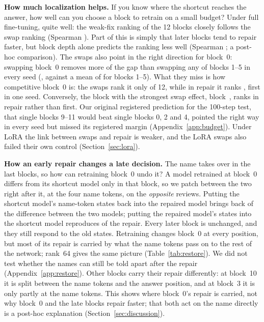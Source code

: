 \textbf{How much localization helps.} If you know where the shortcut reaches the answer, how well can you choose a
block to retrain on a small budget? Under full fine-tuning, quite well: the weak-fix ranking of the 12 blocks closely
follows the swap ranking (Spearman \lThreeSpearmanFullFTRange). Part of this is simply that later blocks tend to repair
faster, but block depth alone predicts the ranking less well (Spearman \lThreeSpearmanDepthFullFTRange; a post-hoc
comparison). The swaps also point in the right direction for block~0: swapping block~0 removes more of the gap than
swapping any of blocks 1--5 in every seed (\swapARemovedBZeroFullFTRange, against a mean of
\lThreeSwapMeanOneToFiveFullFTRange{} for blocks 1--5). What they miss is how competitive block~0 is: the swaps rank it
only \lThreeSwapRankBZeroFullFTRange{} of 12, while in repair it ranks \lThreeRankBZeroFullFTRange, first in one seed.
Conversely, the block with the strongest swap effect, block~\lThreeLocalizedBlockFullFT, ranks
\lThreeRankLocalizedFullFTRange{} in repair rather than first. Our original registered prediction for the 100-step
test, that single blocks 9--11 would beat single blocks 0, 2 and 4, pointed the right way in every seed but missed its
registered margin (Appendix~\ref{app:budget}). Under LoRA the link between swaps and repair is weaker, and the LoRA
swaps also failed their own control (Section~\ref{sec:lora}).

\textbf{How an early repair changes a late decision.} The name takes over in the last blocks, so how can retraining
block~0 undo it? A model retrained at block~0 differs from its shortcut model only in that block, so we patch between
the two right after it, at the four name tokens, on the \emph{opposite} reviews. Putting the shortcut model's
name-token states back into the repaired model brings back \fourBRestoreNameBZeroFullFTRange{} of the difference
between the two models; putting the repaired model's states into the shortcut model reproduces
\fourBReverseNameBZeroFullFTRange{} of the repair. Every later block is unchanged, and they still respond to the old
states. Retraining changes block~0 at every position, but most of its repair is carried by what the name tokens pass
on to the rest of the network; rank~64 gives the same picture (Table~\ref{tab:restore}). We did not test whether the
names can still be told apart after the repair (Appendix~\ref{app:restore}). Other blocks carry their repair
differently: at block~10 it is split between the name tokens and the answer position, and at block~3 it is only partly
at the name tokens. This shows where block~0's repair is carried, not why block~0 and the late blocks repair faster;
that both act on the name directly is a post-hoc explanation (Section~\ref{sec:discussion}).
